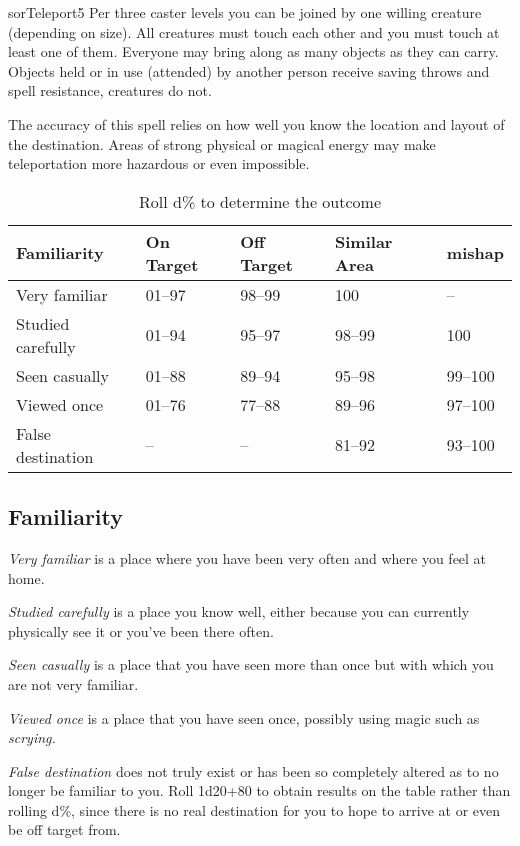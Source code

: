 \begin{spellcard}{sor}{Teleport}{5}
  Per three caster levels you can be joined by one willing creature (depending on size).
  All creatures must touch each other and you must touch at least one of them.
  Everyone may bring along as many objects as they can carry.
  Objects held or in use (attended) by another person receive saving throws and spell resistance, creatures do not.

  The accuracy of this spell relies on how well you know the location and layout of the destination.
  Areas of strong physical or magical energy may make teleportation more hazardous or even impossible.

  \begin{longtable}[]{@{}lllll@{}}
    \caption{Roll d\% to determine the outcome}                                                   \\
    \toprule
    Familiarity       & On Target & Off Target & Similar Area & mishap \tabularnewline\midrule
    \endhead{}
    Very familiar     & 01--97    & 98--99     & 100          & --\tabularnewline{}
    Studied carefully & 01--94    & 95--97     & 98--99       & 100\tabularnewline{}
    Seen casually     & 01--88    & 89--94     & 95--98       & 99--100\tabularnewline{}
    Viewed once       & 01--76    & 77--88     & 89--96       & 97--100\tabularnewline{}
    False destination & --        & --         & 81--92       & 93--100\tabularnewline\bottomrule
  \end{longtable}
  \clearpage%

  \subsection*{Familiarity}
  \emph{Very familiar} is a place where you have been very often and where you feel at home.

  \emph{Studied carefully} is a place you know well, either because you can currently physically see it or you've been there often.

  \emph{Seen casually} is a place that you have seen more than once but with which you are not very familiar.

  \emph{Viewed once} is a place that you have seen once, possibly using magic such as \emph{scrying.}

  \emph{False destination} does not truly exist or has been so completely altered as to no longer be familiar to you.
  Roll 1d20+80 to obtain results on the table rather than rolling d\%,
  since there is no real destination for you to hope to arrive at or even be off target from.


\end{spellcard}
